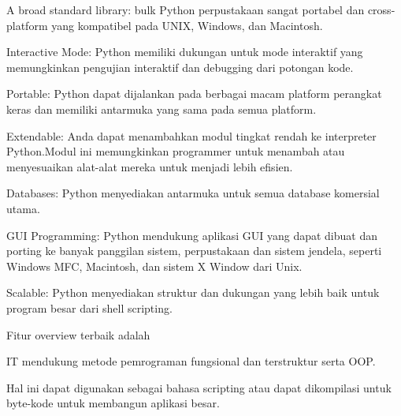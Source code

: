 \documentclass[a4paper,12pt]{report}
\begin{document}
 \par
\noindent 
{\fontsize{14pt}{14pt}\selectfont A broad standard library: bulk Python perpustakaan sangat portabel dan cross-platform yang kompatibel pada UNIX, Windows, dan Macintosh. \\} \par
\noindent 
{\fontsize{14pt}{14pt}\selectfont Interactive Mode: Python memiliki dukungan untuk mode interaktif yang memungkinkan pengujian interaktif dan debugging dari potongan kode. \\} \par
\noindent 
{\fontsize{14pt}{14pt}\selectfont Portable: Python dapat dijalankan pada berbagai macam platform perangkat keras dan memiliki antarmuka yang sama pada semua platform. \\} \par
\noindent 
{\fontsize{14pt}{14pt}\selectfont Extendable: Anda dapat menambahkan modul tingkat rendah ke interpreter Python.Modul ini memungkinkan programmer untuk menambah atau menyesuaikan alat-alat mereka untuk menjadi lebih efisien. \\} \par
\noindent 
{\fontsize{14pt}{14pt}\selectfont Databases: Python menyediakan antarmuka untuk semua database komersial utama. \\} \par
\noindent 
{\fontsize{14pt}{14pt}\selectfont GUI Programming: Python mendukung aplikasi GUI yang dapat dibuat dan porting ke banyak panggilan sistem, perpustakaan dan sistem jendela, seperti Windows MFC, Macintosh, dan sistem X Window dari Unix. \\} \par
\noindent 
{\fontsize{14pt}{14pt}\selectfont Scalable: Python menyediakan struktur dan dukungan yang lebih baik untuk program besar dari shell scripting. \\} \par
\vspace{14pt}
\vspace{14pt}
\noindent 
{\fontsize{14pt}{14pt}\selectfont Fitur overview terbaik adalah  \\} \par
\noindent 
{\fontsize{14pt}{14pt}\selectfont IT mendukung metode pemrograman fungsional dan terstruktur serta OOP. \\} \par
\noindent 
{\fontsize{14pt}{14pt}\selectfont Hal ini dapat digunakan sebagai bahasa scripting atau dapat dikompilasi untuk byte-kode untuk membangun aplikasi besar. \\} \par
\end{document}
